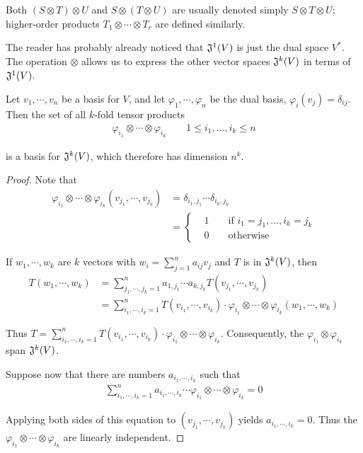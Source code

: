 Both $(S\otimes T)\otimes U$ and $S\otimes (T\otimes U)$ are usually denoted 
simply $S\otimes T\otimes U$; higher-order products $T_1\otimes \cdots \otimes T_r$
are defined similarly.

The reader has probably already noticed that $\mathfrak{J}^1(V)$ is just 
the dual space $V^*$. The operation $\otimes$ allows us to express 
the other vector spaces $\mathfrak{J}^k(V)$ in terms of $\mathfrak{J}^1(V)$.

\begin{theorem}
    Let $v_1, \cdots, v_n$ be a basis for $V$, and let $\varphi_1, \cdots, \varphi_n$ be the 
    dual basis, $\varphi_i(v_j) = \delta_{ij}$. Then the set of all $k$-fold tensor products
    \begin{align*}
        \varphi_{i_1}\otimes\cdots\otimes\varphi_{i_k}\quad\quad1\leq i_1,\ldots,i_k\leq n
    \end{align*}

    is a basis for $\mathfrak{J}^k(V)$, which therefore has dimension $n^k$.
\end{theorem}

\begin{proof}
    Note that 
    \begin{align*}
        \varphi_{i_1}\otimes\cdots\otimes\varphi_{i_k}(v_{j_1},\cdots,v_{j_k})
            & = \delta_{i_1,j_1}\cdots\delta_{i_k,j_k}\\
            & = \left\{\begin{aligned}
                & 1 && \text{ if } i_1=j_1,\ldots,i_k=j_k\\
                & 0 && \text{ otherwise}
            \end{aligned}\right.
    \end{align*}

    If $w_1, \cdots, w_k$ are $k$ vectors with $w_i = \sum_{j=1}^{n}{a_{ij}v_j}$ and $T$
    is in $\mathfrak{J}^k(V)$, then
    \begin{align*}
        T(w_1, \cdots, w_k) 
        & = \sum_{j_1, \cdots, j_k=1}^{n}{a_{1,j_1}\cdots a_{k,j_k}T(v_{j_1}, \cdots, v_{j_k})} \\
        & = \sum_{i_1, \cdots, i_k=1}^{n}{
            T(v_{i_1}, \cdots, v_{i_k})\cdot\varphi_{i_1}\otimes \cdots \otimes \varphi_{i_k}(w_1, \cdots, w_k) }
    \end{align*}

    Thus $T=\sum_{i_1,\cdots,i_k=1}^{n}{T(v_{i_1}, \cdots, v_{i_k})\cdot 
    \varphi_{i_1}\otimes \cdots \otimes \varphi_{i_k}}$. Consequently, the $\varphi_{i_1}\otimes \varphi_{i_k}$
    span $\mathfrak{J}^k(V)$.

    Suppose now that there are numbers $a_{i_1, \cdots, i_k}$ such that 
    \begin{align*}
        \sum_{i_1, \cdots, i_k=1}^{n}{a_{i_1,\cdots, i_k}\cdots \varphi_{i_1}\otimes \cdots \otimes \varphi_{i_k}}=0
    \end{align*}

    Applying both sides of this equation to $(v_{j_1}, \cdots, v_{j_k})$ yields 
    $a_{i_1,\cdots, i_k}=0$. Thus the $\varphi_{i_1}\otimes \cdots \otimes \varphi_{i_k}$ 
    are linearly independent.
\end{proof}

